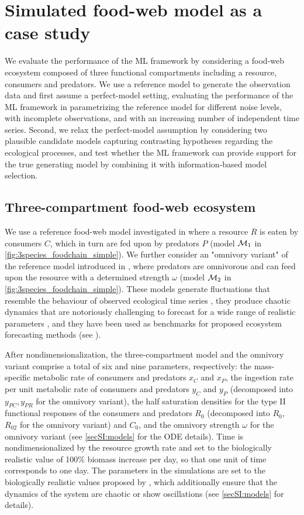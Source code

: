 \section{Simulated food-web model as a case study}\label{sec:numerical_simulations}

We evaluate the performance of the ML framework by considering a food-web ecosystem composed of three functional compartments including a resource, consumers and predators. 
%
We use a reference model to generate the observation data and first assume a perfect-model setting, evaluating the performance of the ML framework in parametrizing the reference model for different noise levels, with incomplete observations, and with an increasing number of independent time series.
%
Second, we relax the perfect-model assumption by considering two plausible candidate models capturing contrasting hypotheses regarding the ecological processes, and test whether the ML framework can provide support for the true generating model by combining it with information-based model selection.

\subsection{Three-compartment food-web ecosystem}
We use a reference food-web model investigated in \cite{Hastings1991,McCann1994a,McCann1994,Klebanoff1994} where a resource $R$ is eaten by consumers $C$, which in turn are fed upon by predators $P$ (model $\mathcal{M}_1$ in \cref{fig:3species_foodchain_simple}). We further consider an "omnivory variant" of the reference model introduced in \cite{McCann1997}, where predators are omnivorous and can feed upon the resource with a determined strength $\omega$ (model $\mathcal{M}_2$ in \cref{fig:3species_foodchain_simple}). 
%
These models generate fluctuations that resemble the behaviour of observed ecological time series \cite{Bjornstad2001}, they produce chaotic dynamics that are notoriously challenging to forecast for a wide range of realistic parameters \cite{Post2000}, and they have been used as benchmarks for proposed ecosystem forecasting methods (see \cite{Perretti2013,Deyle2016,Ye2016}). 
 
After nondimensionalization, the three-compartment model and the omnivory variant comprise a total of six and nine parameters, respectively: the mass-specific metabolic rate of consumers and predators $x_C$ and $x_P$, the ingestion rate per unit metabolic rate of consumers and predators $y_C$ and $y_P$ (decomposed into $y_{PC}, y_{PR}$ for the omnivory variant), the half saturation densities for the type II functional responses of the consumers and predators $R_0$ (decomposed into $R_0$, $R_{02}$ for the omnivory variant) and $C_0$, and the omnivory strength $\omega$ for the omnivory variant (see \cref{secSI:models} for the ODE details). 
%
Time is nondimensionalized by the resource growth rate and set to the biologically realistic value of 100\% biomass increase per day, so that one unit of time corresponds to one day. The parameters in the simulations are set to the biologically realistic values proposed by \cite{McCann1994,McCann1997}, which additionally ensure that the dynamics of the system are chaotic or show oscillations (see \cref{secSI:models} for details).

